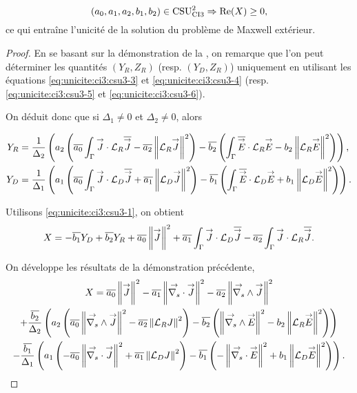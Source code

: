   
 \begin{prop}
    \label{prop:csu:ci3-2}
    \begin{equation*}
      (a_0,a_1,a_2,b_1,b_2) \in \CSU[2]{CI3} \Rightarrow \Re(X) \ge 0,
    \end{equation*}
    ce qui entraîne l'unicité de la solution du problème de Maxwell extérieur.
  \end{prop}

  \begin{proof}
    En se basant sur la démonstration de la , on remarque que l'on peut déterminer les quantités \((Y_R,Z_R)\) (resp. \((Y_D,Z_R)\)) uniquement en utilisant les équations \eqref{eq:unicite:ci3:csu3-3} et \eqref{eq:unicite:ci3:csu3-4} (resp. \eqref{eq:unicite:ci3:csu3-5} et \eqref{eq:unicite:ci3:csu3-6}).

    On déduit donc que si \(\Delta_1 \not = 0\) et \(\Delta_2 \not = 0\), alors

    \begin{align*}
      Y_R &= \frac{1}{\Delta_2}\left(a_2\left(\conj{a_0}\int_\Gamma \vJ\cdot\LR\conj{\vJ} - \conj{a_2}\norm{\LR \vJ}^2\right)  -\conj{b_2}\left(\int_\Gamma \conj{\vE}\cdot\LR{\vE} - b_2 \norm{\LR \vE}^2\right)\right), \\
      Y_D &= \frac{1}{\Delta_1}\left(a_1\left(\conj{a_0}\int_\Gamma \vJ\cdot\LD\conj{\vJ} + \conj{a_1}\norm{\LD \vJ}^2\right)  -\conj{b_1}\left(\int_\Gamma \conj{\vE}\cdot\LD{\vE} + b_1 \norm{\LD \vE}^2\right)\right).
    \end{align*}

    Utilisons \eqref{eq:unicite:ci3:csu3-1}, on obtient
    \begin{equation*}
      X = -\conj{b_1} Y_D + \conj{b_2} Y_R + \conj{a_0} \norm{\vJ}^2 + \conj{a_1} \int_\Gamma \vJ \cdot \LD \conj{\vJ} - \conj{a_2} \int_\Gamma \vJ \cdot \LR \conj{\vJ}.
    \end{equation*}

    On développe les résultats de la démonstration précédente,
    \begin{multline*}
      X = \conj{a_0} \norm{\vJ }^2 - \conj{a_1} \norm{\vdivs \vJ }^2 - \conj{a_2} \norm{\vrots \vJ }^2
      \\
      + \frac{\conj{b_2}}{\Delta_2}\left(a_2\left(\conj{a_0}\norm{\vrots \vJ}^2 - \conj{a_2}\norm{\LR J}^2\right)  -\conj{b_2}\left(\norm{\vrots\vE}^2 - b_2 \norm{\LR \vE }^2\right)\right)
      \\
      - \frac{\conj{b_1}}{\Delta_1}\left(a_1\left(-\conj{a_0}\norm{\vdivs\vJ}^2 + \conj{a_1}\norm{\LD J}^2\right)  -\conj{b_1}\left(-\norm{\vdivs\vE}^2 + b_1 \norm{\LD \vE }^2\right)\right).
    \end{multline*}


\end{proof}
